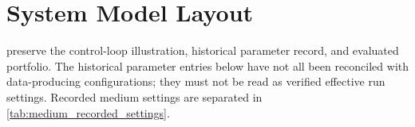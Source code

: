 

\section{System Model Layout}

 preserve the control-loop illustration, historical parameter record, and evaluated portfolio. The historical parameter entries below have not all been reconciled with data-producing configurations; they must not be read as verified effective run settings. Recorded medium settings are separated in \cref{tab:medium_recorded_settings}.

